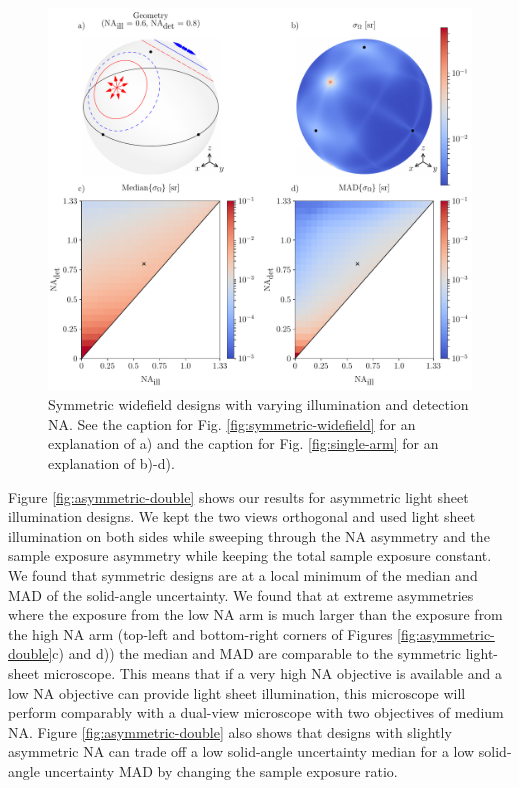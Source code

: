 \documentclass[10pt]{article}
\begin{document}
\begin{figure}[htbp]
\centering\includegraphics[width=\textwidth]{double-arm}
\caption{Symmetric widefield designs with varying illumination and detection NA. See the
  caption for Fig. \ref{fig:symmetric-widefield} for an explanation of a) and
  the caption for Fig. \ref{fig:single-arm} for an explanation of b)-d).}
\label{fig:double-arm}
\end{figure}

Figure \ref{fig:asymmetric-double} shows our results for asymmetric light sheet
illumination designs. We kept the two views orthogonal and used light sheet
illumination on both sides while sweeping through the NA asymmetry and the
sample exposure asymmetry while keeping the total sample exposure constant. We
found that symmetric designs are at a local minimum of the median and MAD of the
solid-angle uncertainty. We found that at extreme asymmetries where the exposure
from the low NA arm is much larger than the exposure from the high NA arm
(top-left and bottom-right corners of Figures \ref{fig:asymmetric-double}c) and
d)) the median and MAD are comparable to the symmetric light-sheet
microscope. This means that if a very high NA objective is available and a low
NA objective can provide light sheet illumination, this microscope will perform
comparably with a dual-view microscope with two objectives of medium NA. Figure
\ref{fig:asymmetric-double} also shows that designs with slightly asymmetric NA
can trade off a low solid-angle uncertainty median for a low solid-angle
uncertainty MAD by changing the sample exposure ratio.
\end{document}
